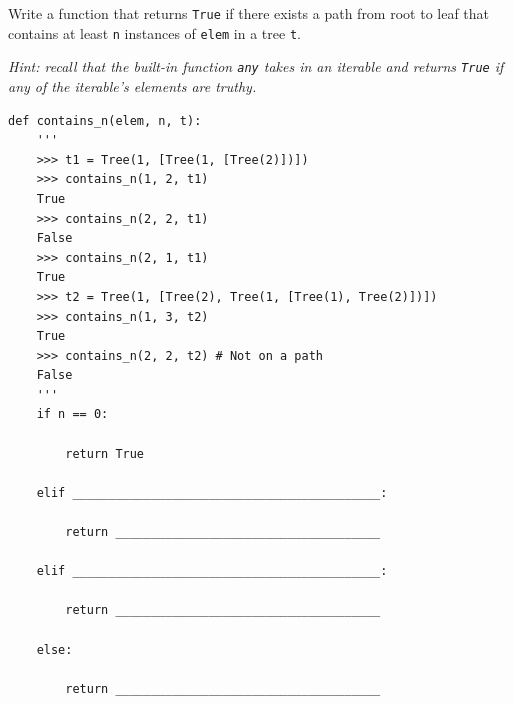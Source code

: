 \begin{blocksection}
\question Write a function that returns \lstinline{True} if there exists a path from root to leaf that contains at least \lstinline{n} instances of \lstinline{elem} in a tree \lstinline{t}.

\textit{Hint: recall that the built-in function \lstinline{any} takes in an iterable and returns \lstinline{True} if any of the iterable's elements are truthy. }

\begin{lstlisting}
def contains_n(elem, n, t):
    '''
    >>> t1 = Tree(1, [Tree(1, [Tree(2)])])
    >>> contains_n(1, 2, t1)
    True
    >>> contains_n(2, 2, t1)
    False
    >>> contains_n(2, 1, t1)
    True
    >>> t2 = Tree(1, [Tree(2), Tree(1, [Tree(1), Tree(2)])])
    >>> contains_n(1, 3, t2)
    True
    >>> contains_n(2, 2, t2) # Not on a path
    False
    '''
    if n == 0:
		
        return True
				
    elif ___________________________________________:
		
        return _____________________________________
				
    elif ___________________________________________:
		
        return _____________________________________
				
    else:
    
        return _____________________________________
\end{lstlisting}
\end{blocksection}
